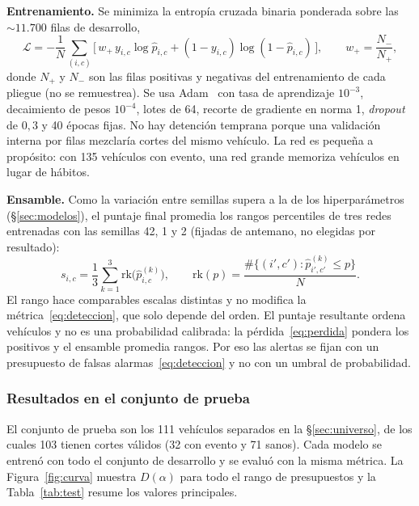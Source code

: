\textbf{Entrenamiento.} Se minimiza la entropía cruzada binaria ponderada sobre las $\sim 11.700$ filas de desarrollo,
\begin{equation}
  \mathcal{L} = -\frac{1}{N}\sum_{(i,c)} \Big[\, w_{+}\, y_{i,c} \log \hat p_{i,c} + (1 - y_{i,c}) \log(1 - \hat p_{i,c}) \,\Big],
  \qquad w_{+} = \frac{N_{-}}{N_{+}},
  \label{eq:perdida}
\end{equation}
donde $N_{+}$ y $N_{-}$ son las filas positivas y negativas del entrenamiento de cada pliegue (no se remuestrea). Se usa
Adam~\cite{kingma2015} con tasa de aprendizaje $10^{-3}$, decaimiento de pesos $10^{-4}$, lotes de 64, recorte de gradiente
en norma 1, \emph{dropout} de $0{,}3$ y 40 épocas fijas. No hay detención temprana porque una validación interna por filas
mezclaría cortes del mismo vehículo. La red es pequeña a propósito: con 135 vehículos con evento, una red grande memoriza
vehículos en lugar de hábitos.

\textbf{Ensamble.} Como la variación entre semillas supera a la de los hiperparámetros (\S\ref{sec:modelos}), el
puntaje final promedia los rangos percentiles de tres redes entrenadas con las semillas 42, 1 y 2 (fijadas de antemano, no
elegidas por resultado):
\begin{equation}
  s_{i,c} = \frac{1}{3}\sum_{k=1}^{3} \mathrm{rk}\big(\hat p^{(k)}_{i,c}\big), \qquad
  \mathrm{rk}(p) = \frac{\#\{(i',c') : \hat p^{(k)}_{i',c'} \le p\}}{N}.
  \label{eq:ensamble}
\end{equation}
El rango hace comparables escalas distintas y no modifica la métrica~\eqref{eq:deteccion}, que solo depende del orden.
El puntaje resultante ordena vehículos y no es una probabilidad calibrada: la pérdida~\eqref{eq:perdida} pondera los
positivos y el ensamble promedia rangos. Por eso las alertas se fijan con un presupuesto de falsas alarmas~\eqref{eq:deteccion}
y no con un umbral de probabilidad.

\subsubsection{Resultados en el conjunto de prueba}
\label{sec:test}

El conjunto de prueba son los 111 vehículos separados en la \S\ref{sec:universo}, de los cuales 103 tienen cortes válidos
(32 con evento y 71 sanos). Cada modelo se entrenó con todo el conjunto de desarrollo y se evaluó con la misma
métrica. La Figura~\ref{fig:curva} muestra $D(\alpha)$ para todo el rango de presupuestos y la Tabla~\ref{tab:test} resume
los valores principales.

